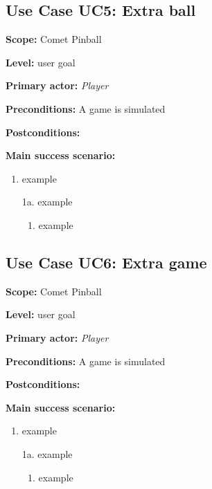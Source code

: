 \documentclass[fontsize=12pt,
               paper=a4,
               twoside=false,
               parskip=half,
               ]{scrartcl}
\begin{document}


\subsection{Use Case UC5: Extra ball}

\textbf{\textsf{Scope:}} Comet Pinball

\textbf{\textsf{Level:}} user goal

\textbf{\textsf{Primary actor:}} \emph{Player}

\textbf{\textsf{Preconditions:}} A game is simulated 

\textbf{\textsf{Postconditions:}} 

\textbf{\textsf{Main success scenario:}}

\begin{enumerate}[leftmargin=3em]
	\item example
\end{enumerate}


\begin{itemize}[leftmargin=3em]
	\item[1a.]  example
	\begin{enumerate}
		\item example
	\end{enumerate}
\end{itemize}



\subsection{Use Case UC6: Extra game}

\textbf{\textsf{Scope:}} Comet Pinball

\textbf{\textsf{Level:}} user goal

\textbf{\textsf{Primary actor:}} \emph{Player}

\textbf{\textsf{Preconditions:}} A game is simulated 

\textbf{\textsf{Postconditions:}} 

\textbf{\textsf{Main success scenario:}}

\begin{enumerate}[leftmargin=3em]
	\item example
\end{enumerate}


\begin{itemize}[leftmargin=3em]
	\item[1a.]  example
	\begin{enumerate}
		\item example
	\end{enumerate}
\end{itemize}
\end{document}
